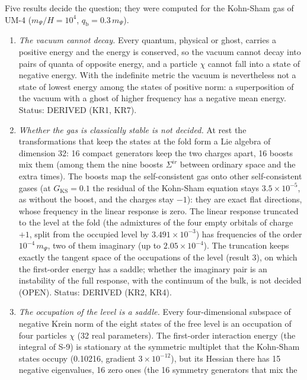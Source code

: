 \documentclass[
  10pt,
]{article}
\providecommand{\tightlist}{%
  \setlength{\itemsep}{0pt}\setlength{\parskip}{0pt}}
\begin{document}
Five results decide the question; they were computed for the Kohn-Sham
gas of UM-4 (\(m_\Psi/H = 10^4\), \(q_{\mathrm{b}} = 0.3\,m_\Psi\)).

\begin{enumerate}
\def\labelenumi{\arabic{enumi}.}
\tightlist
\item
  \emph{The vacuum cannot decay.} Every quantum, physical or ghost,
  carries a positive energy and the energy is conserved, so the vacuum
  cannot decay into pairs of quanta of opposite energy, and a particle
  \(\chi\) cannot fall into a state of negative energy. With the
  indefinite metric the vacuum is nevertheless not a state of lowest
  energy among the states of positive norm: a superposition of the
  vacuum with a ghost of higher frequency has a negative mean energy.
  Status: DERIVED (KR1, KR7).
\item
  \emph{Whether the gas is classically stable is not decided.} At rest
  the transformations that keep the states at the fold form a Lie
  algebra of dimension 32: 16 compact generators keep the two charges
  apart, 16 boosts mix them (among them the nine boosts \(\Sigma^{ir}\)
  between ordinary space and the extra times). The boosts map the
  self-consistent gas onto other self-consistent gases (at
  \(G_{\mathrm{KS}} = 0.1\) the residual of the Kohn-Sham equation stays
  \(3.5\times10^{-5}\), as without the boost, and the charges stay
  \(-1\)): they are exact flat directions, whose frequency in the linear
  response is zero. The linear response truncated to the level at the
  fold (the admixtures of the four empty orbitals of charge \(+1\),
  split from the occupied level by \(3.491\times10^{-3}\)) has
  frequencies of the order \(10^{-4}\,m_\Psi\), two of them imaginary
  (up to \(2.05\times10^{-4}\)). The truncation keeps exactly the
  tangent space of the occupations of the level (result 3), on which the
  first-order energy has a saddle; whether the imaginary pair is an
  instability of the full response, with the continuum of the bulk, is
  not decided (OPEN). Status: DERIVED (KR2, KR4).
\item
  \emph{The occupation of the level is a saddle.} Every four-dimensional
  subspace of negative Krein norm of the eight states of the free level
  is an occupation of four particles \(\chi\) (32 real parameters). The
  first-order interaction energy (the integral of S-9) is stationary at
  the symmetric multiplet that the Kohn-Sham states occupy (0.10216,
  gradient \(3\times10^{-12}\)), but its Hessian there has 15 negative
  eigenvalues, 16 zero ones (the 16 symmetry generators that mix the

\end{enumerate}
\end{document}
